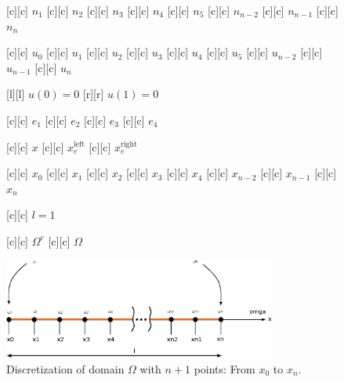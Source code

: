 \begin{figure}[ht]
	\centering
	\footnotesize

	[c] {$n_1$}
	[c] {$n_2$}
	[c] {$n_3$}
	[c] {$n_4$}
	[c] {$n_5$}
	[c] {$n_{n-2}$}
	[c] {$n_{n-1}$}
	[c] {$n_{n}$}

	[c] {$u_0$}
	[c] {$u_1$}
	[c] {$u_2$}
	[c] {$u_3$}
	[c] {$u_4$}
	[c] {$u_5$}
	[c] {$u_{n-2}$}
	[c] {$u_{n-1}$}
	[c] {$u_{n}$}

	[l] {$u(0)=0$}
	[r] {$u(1)=0$}

	[c] {$e_1$}
	[c] {$e_2$}
	[c] {$e_3$}
	[c] {$e_4$}

	[c] {$x$}
	[c] {$x_{e}^{\text{left}}$}
	[c] {$x_{e}^{\text{right}}$}

	[c] {$x_0$}
	[c] {$x_1$}
	[c] {$x_2$}
	[c] {$x_3$}
	[c] {$x_4$}
	[c] {$x_{n-2}$}
	[c] {$x_{n-1}$}
	[c] {$x_{n}$}

	[c] {$l=1$}


	[c] {$\Omega^{e}$}
	[c] {$\Omega$}

	\includegraphics[width=0.8\textwidth]{discretizeGhost.eps}

	\caption{Discretization of domain $\Omega$ with $n+1$ points: From $x_{0}$ to $x_{n}$.}
	\label{\LABEL}
\end{figure}